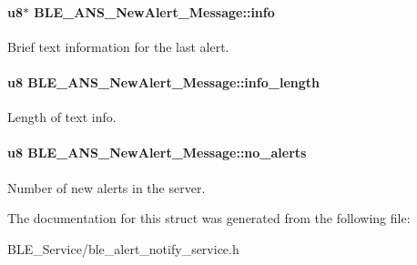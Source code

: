 \paragraph[{\texorpdfstring{info}{info}}]{\setlength{\rightskip}{0pt plus 5cm}u8$\ast$ B\+L\+E\+\_\+\+A\+N\+S\+\_\+\+New\+Alert\+\_\+\+Message\+::info}\hypertarget{struct_b_l_e___a_n_s___new_alert___message_ad77920092d97c0b966543e508f184321}{}\label{struct_b_l_e___a_n_s___new_alert___message_ad77920092d97c0b966543e508f184321}
Brief text information for the last alert. 
\paragraph[{\texorpdfstring{info\+\_\+length}{info_length}}]{\setlength{\rightskip}{0pt plus 5cm}u8 B\+L\+E\+\_\+\+A\+N\+S\+\_\+\+New\+Alert\+\_\+\+Message\+::info\+\_\+length}\hypertarget{struct_b_l_e___a_n_s___new_alert___message_a32de18fe414f44ece955b36a01af2a2d}{}\label{struct_b_l_e___a_n_s___new_alert___message_a32de18fe414f44ece955b36a01af2a2d}
Length of text info. 
\paragraph[{\texorpdfstring{no\+\_\+alerts}{no_alerts}}]{\setlength{\rightskip}{0pt plus 5cm}u8 B\+L\+E\+\_\+\+A\+N\+S\+\_\+\+New\+Alert\+\_\+\+Message\+::no\+\_\+alerts}\hypertarget{struct_b_l_e___a_n_s___new_alert___message_a74bc11d3f3cc372333cf4afc7a5c0974}{}\label{struct_b_l_e___a_n_s___new_alert___message_a74bc11d3f3cc372333cf4afc7a5c0974}
Number of new alerts in the server. 

The documentation for this struct was generated from the following file\+:\begin{DoxyCompactItemize}
\item 
B\+L\+E\+\_\+\+Service/ble\+\_\+alert\+\_\+notify\+\_\+service.\+h\end{DoxyCompactItemize}
